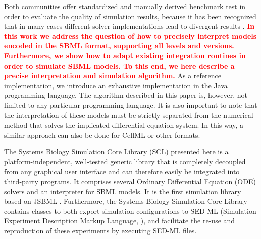 \documentclass[10pt]{bmc_article}
\newenvironment{bmcformat}{\baselineskip20pt\sloppy\setboolean{publ}{false}}{\baselineskip20pt\sloppy}
\newcommand{\TODO}[1]{\textcolor{red}{\textbf{#1}}}
\begin{document}
\begin{bmcformat}
Both communities offer standardized and manually derived benchmark test in order
to evaluate the quality of simulation results, because it has been recognized that in many cases
different solver implementations lead to divergent results \cite{Bergmann2008}.
\TODO{In this work we address the question of how to precisely interpret models encoded in
the SBML format, supporting all levels and versions. Furthermore, we show how to adapt existing integration 
routines in order to simulate SBML models. To this end, we here describe a precise interpretation and simulation algorithm.}
As a reference implementation, we introduce an exhaustive implementation in the Java\texttrademark{} programming
language. The algorithm described in this paper is, however, not limited to any
particular programming language. It is also important to note that the
interpretation of these models must be strictly separated from the numerical
method that solves the implicated differential equation system. In this way, a
similar approach can also be done for CellML or other formats.


%
%
%
%
The Systems Biology Simulation Core Library (SCL) presented here is a platform-independent,
well-tested generic library that is completely decoupled from any graphical
user interface and can therefore easily be integrated into third-party programs.
It comprises several Ordinary Differential Equation (ODE)
solvers and an interpreter for SBML models. It is the first simulation library
based on JSBML \cite{Draeger2011b}. 
%
%
Furthermore, the Systems Biology Simulation Core Library contains classes to both export
simulation configurations to SED-ML (Simulation Experiment Description Markup Language,
\cite{Waltemath2011}), and facilitate the re-use and reproduction of these
experiments by executing SED-ML files.


\end{bmcformat}
\end{document}
